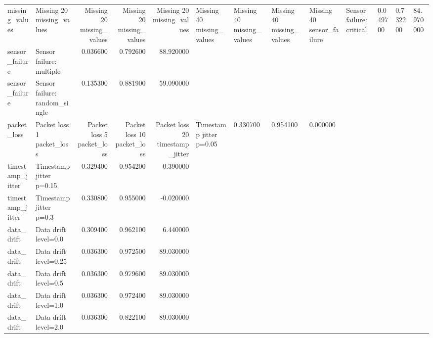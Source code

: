 \begin{table}
\begin{tabular}{llrrr}
missing_values & Missing 20%
missing_values & Missing 20%
missing_values & Missing 20%
missing_values & Missing 20%
missing_values & Missing 40%
missing_values & Missing 40%
missing_values & Missing 40%
missing_values & Missing 40%
sensor_failure & Sensor failure: critical & 0.049700 & 0.732200 & 84.970000 \\
sensor_failure & Sensor failure: multiple & 0.036600 & 0.792600 & 88.920000 \\
sensor_failure & Sensor failure: random_single & 0.135300 & 0.881900 & 59.090000 \\
packet_loss & Packet loss 1%
packet_loss & Packet loss 5%
packet_loss & Packet loss 10%
packet_loss & Packet loss 20%
timestamp_jitter & Timestamp jitter p=0.05 & 0.330700 & 0.954100 & 0.000000 \\
timestamp_jitter & Timestamp jitter p=0.15 & 0.329400 & 0.954200 & 0.390000 \\
timestamp_jitter & Timestamp jitter p=0.3 & 0.330800 & 0.955000 & -0.020000 \\
data_drift & Data drift level=0.0 & 0.309400 & 0.962100 & 6.440000 \\
data_drift & Data drift level=0.25 & 0.036300 & 0.972500 & 89.030000 \\
data_drift & Data drift level=0.5 & 0.036300 & 0.979600 & 89.030000 \\
data_drift & Data drift level=1.0 & 0.036300 & 0.972400 & 89.030000 \\
data_drift & Data drift level=2.0 & 0.036300 & 0.822100 & 89.030000 \\

\end{tabular}
\end{table}
